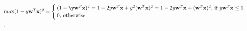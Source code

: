 \newcommand{\w}{\mathbf{w}}
\newcommand{\x}{\mathbf{x}}

\begin{pr}
$\max(1-y\w^T\x)^2=\begin{cases}
(1-\y\w^T\x)^2=1-2y\w^T\x+y^2(\w^T\x)^2=1-2y\w^T\x+(\w^T\x)^2\text{, if }y\w^T\x\leq1\\
0\text{, otherwise}
\end{cases}$.\\

\end{pr}
